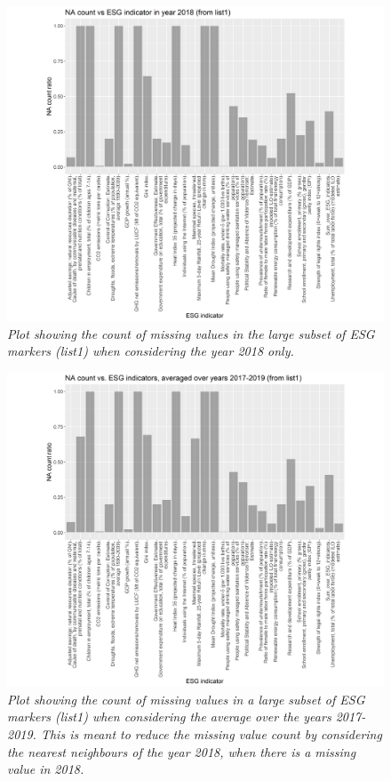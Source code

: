 \documentclass{article}
\begin{document}
	\begin{figure} 
		\centering
		\includegraphics[width=1\linewidth]{nan_2018_per_esg_indicator.png}
		\caption{\textit{Plot showing the count of missing values in the large subset of ESG markers (list1) when considering the year 2018 only.}}
		\label{fig:nan_2018_per_esg_indicator}
	\end{figure}
	\begin{figure} 
		\centering
		\includegraphics[width=1\linewidth]{nan_mean_2018_per_esg_indicator.png}
		\caption{\textit{Plot showing the count of missing values in a large subset of ESG markers (list1) when considering the average over the years 2017-2019. This is meant to reduce the missing value count by considering the nearest neighbours of the year 2018, when there is a missing value in 2018.}}
		\label{fig:nan_mean_2018_per_esg_indicator}
	\end{figure}
\end{document}
